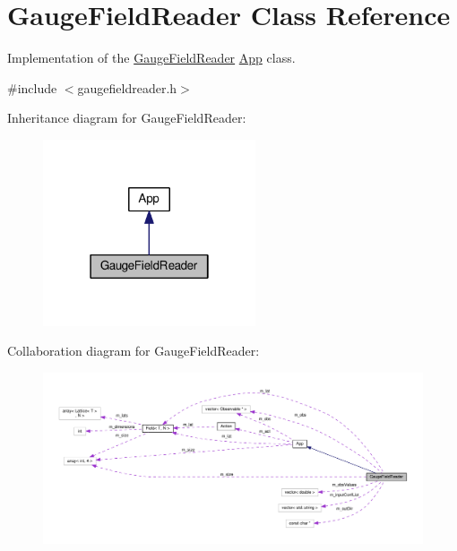\hypertarget{classGaugeFieldReader}{}\section{Gauge\+Field\+Reader Class Reference}
\label{classGaugeFieldReader}


Implementation of the \hyperlink{classGaugeFieldReader}{Gauge\+Field\+Reader} \hyperlink{classApp}{App} class.  




{\ttfamily \#include $<$gaugefieldreader.\+h$>$}



Inheritance diagram for Gauge\+Field\+Reader\+:\nopagebreak
\begin{figure}[H]
\begin{center}
\leavevmode
\includegraphics[width=178pt]{d8/dcd/classGaugeFieldReader__inherit__graph}
\end{center}
\end{figure}


Collaboration diagram for Gauge\+Field\+Reader\+:\nopagebreak
\begin{figure}[H]
\begin{center}
\leavevmode
\includegraphics[width=350pt]{d7/d2a/classGaugeFieldReader__coll__graph}
\end{center}
\end{figure}
